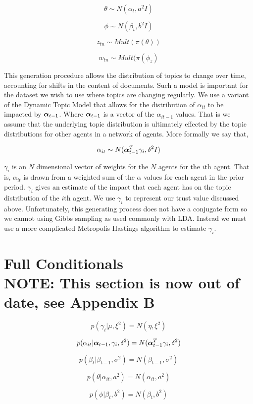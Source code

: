 \documentclass[a4paper]{article}
\begin{document}
\[\theta \sim N(\alpha_t, a^2I)\]

\[\phi \sim N(\beta_t, b^2I)\]

\[z_{tn} \sim Mult(\pi(\theta))\]

\[w_{tn} \sim Mult(\pi(\phi_z)\]

This generation procedure allows the distribution of topics to change over time, accounting for shifts in the content of documents.  Such a model is important for the dataset we wish to use where topics are changing regularly.  We use a variant of the Dynamic Topic Model that allows for the distribution of $\alpha_{it}$ to be impacted by $\text{\boldmath$\alpha$}_{t-1}$.  Where $\text{\boldmath$\alpha$}_{t-1}$ is a vector of the $\alpha_{it-1}$ values.  That is we assume that the underlying topic distribution is ultimately effected by the topic distributions for other agents in a network of agents.  More formally we say that,

\[\alpha_{it} \sim N(\text{\boldmath$\alpha$}_{t-1}^T \gamma_i, \delta^2I)\]

$\gamma_i$ is an $N$ dimensional vector of weights for the $N$ agents for the $i$th agent.  That is, $\alpha_{it}$ is drawn from a weighted sum of the $\alpha$ values for each agent in the prior period.  $\gamma_i$ gives an estimate of the impact that each agent has on the topic distribution of the $i$th agent.  We use $\gamma_i$ to represent our trust value discussed above.  Unfortunately, this generating process does not have a conjugate form so we cannot using Gibbs sampling as used commonly with LDA.  Instead we must use a more complicated Metropolis Hastings algorithm to estimate $\gamma_i$.

\newpage
\appendix

\section{Full Conditionals\\ NOTE: This section is now out of date, see Appendix B}

\[p(\gamma_i | \mu, \xi^2) = N(\eta, \xi^2)\]

\[p(\alpha_{it} | \text{\boldmath$\alpha$}_{t-1}, \gamma_i, \delta^2) = N(\text{\boldmath$\alpha$}^T_{t-1} \gamma_i, \delta^2)\]

\[p(\beta_t | \beta_{t-1}, \sigma^2) = N(\beta_{t-1}, \sigma^2)\]

\[p(\theta | \alpha_{it}, a^2) = N(\alpha_{it}, a^2)\] 

\[p(\phi | \beta_t, b^2) = N(\beta_t, b^2)\]
\end{document}
